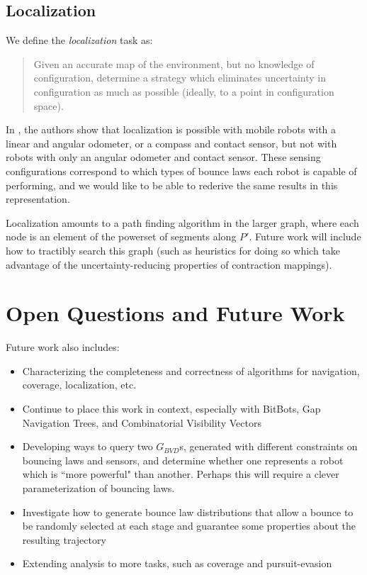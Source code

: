\documentclass[]{article}  %
\begin{document}
\subsection{Localization}

We define the \emph{localization} task as:

\begin{quotation}
Given an accurate map of the environment, but no knowledge of configuration,
determine a strategy which eliminates uncertainty in configuration as much as
possible (ideally, to a point in configuration space).
\end{quotation}

In \cite{OkaLav06}, the authors show that localization is possible with
mobile robots with a linear and angular odometer, or a compass and contact
sensor, but not with robots with only an angular odometer and contact sensor.
These sensing configurations correspond to which types of bounce laws each robot
is capable of performing, and we would like to be able to rederive the same
results in this representation.

Localization amounts to a path finding algorithm in the larger graph, where each
node is an element of the powerset of segments along $P'$. Future work will
include how to tractibly search this graph (such as heuristics for doing so
which take advantage of the uncertainty-reducing properties of contraction
mappings).


\section{Open Questions and Future Work}

Future work also includes:

\begin{itemize}
\item Characterizing the completeness and correctness of algorithms for
navigation, coverage, localization, etc.
\item Continue to place this work in context, especially with BitBots, Gap
Navigation Trees, and Combinatorial Visibility Vectors
\item Developing ways to query two $G_{BVD}$s, generated with different constraints on
 bouncing laws and sensors, and determine whether one represents a robot which
is ``more powerful" than another. Perhaps this will require a clever
parameterization of bouncing laws.
\item Investigate how to generate bounce law distributions that allow a bounce
to be randomly selected at each stage and guarantee some properties about the
resulting trajectory
\item Extending analysis to more tasks, such as coverage and pursuit-evasion
\end{itemize}





\end{document}
